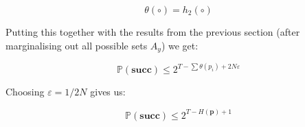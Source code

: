 \documentclass[11pt]{article}
\renewcommand{\vec}[1]{\mathbf{#1}}
\begin{document}
\begin{equation}
\theta \left(\circ \right) = h_2 \left(\circ \right)
\end{equation}

Putting this together with the results from the previous section (after marginalising out all possible sets \(\mathit{A_y}\)) we get:

\begin{equation}
\mathbb{P}\left(\textbf{succ}\right) \leq {2^{T-\sum \theta\left(p_i\right) +2N\varepsilon } }
\end{equation}

Choosing \(\varepsilon = 1/2N\) gives us:

\begin{equation}
\mathbb{P}\left(\textbf{succ}\right) \leq {2^{T-H\left(\vec{p}\right) + 1} }
\end{equation}
\end{document}
